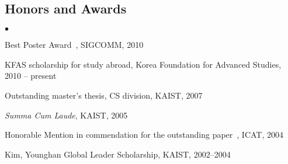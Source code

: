 \documentclass[margin,line]{res}
\newenvironment{list1}{
  \begin{list}{\ding{113}}{%
      \setlength{\itemsep}{0in}
      \setlength{\parsep}{0in} \setlength{\parskip}{0in}
      \setlength{\topsep}{0in} \setlength{\partopsep}{0in}
      \setlength{\leftmargin}{0.17in}}}{\end{list}}
\newenvironment{list2}{
  \begin{list}{$\bullet$}{%
      \setlength{\itemsep}{0in}
      \setlength{\parsep}{0in} \setlength{\parskip}{0in}
      \setlength{\topsep}{0in} \setlength{\partopsep}{0in}
      \setlength{\leftmargin}{0.2in}}}{\end{list}}
\begin{document}
\begin{resume}
\section{\sc Honors and Awards} 
\begin{list2}
\item{Best Poster Award~\cite{sigcomm10}, SIGCOMM, 2010}
\item{KFAS scholarship for study abroad, Korea Foundation for Advanced Studies, 2010 -- present}
\item{Outstanding master's thesis, CS division, KAIST, 2007}
\item{\textit{Summa Cum Laude}, KAIST, 2005}
\item{Honorable Mention in commendation for the outstanding paper~\cite{icat04}, ICAT, 2004}
\item{Kim, Younghan Global Leader Scholarship, KAIST, 2002--2004}
\end{list2}






\end{resume}
\end{document}
